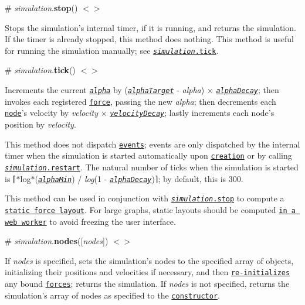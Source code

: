 \label{_simulation_stop}%
\# {\itshape simulation}.{\bfseries stop}() \href{https://github.com/d3/d3-force/blob/master/src/simulation.js#L84}{\tt $<$$>$}

Stops the simulation’s internal timer, if it is running, and returns the simulation. If the timer is already stopped, this method does nothing. This method is useful for running the simulation manually; see \href{#simulation_tick}{\tt {\itshape simulation}.tick}.

\label{_simulation_tick}%
\# {\itshape simulation}.{\bfseries tick}() \href{https://github.com/d3/d3-force/blob/master/src/simulation.js#L38}{\tt $<$$>$}

Increments the current \href{#simulation_alpha}{\tt {\itshape alpha}} by (\href{#simulation_alphaTarget}{\tt {\itshape alpha\+Target}} -\/ {\itshape alpha}) × \href{#simulation_alphaDecay}{\tt {\itshape alpha\+Decay}}; then invokes each registered \href{#simulation_force}{\tt force}, passing the new {\itshape alpha}; then decrements each \href{#simulation_nodes}{\tt node}’s velocity by {\itshape velocity} × \href{#simulation_velocityDecay}{\tt {\itshape velocity\+Decay}}; lastly increments each node’s position by {\itshape velocity}.

This method does not dispatch \href{#simulation_on}{\tt events}; events are only dispatched by the internal timer when the simulation is started automatically upon \href{#forceSimulation}{\tt creation} or by calling \href{#simulation_restart}{\tt {\itshape simulation}.restart}. The natural number of ticks when the simulation is started is ⌈$\ast$log$\ast$(\href{#simulation_alphaMin}{\tt {\itshape alpha\+Min}}) / {\itshape log}(1 -\/ \href{#simulation_alphaDecay}{\tt {\itshape alpha\+Decay}})⌉; by default, this is 300.

This method can be used in conjunction with \href{#simulation_stop}{\tt {\itshape simulation}.stop} to compute a \href{https://bl.ocks.org/mbostock/1667139}{\tt static force layout}. For large graphs, static layouts should be computed \href{https://bl.ocks.org/mbostock/01ab2e85e8727d6529d20391c0fd9a16}{\tt in a web worker} to avoid freezing the user interface.

\label{_simulation_nodes}%
\# {\itshape simulation}.{\bfseries nodes}(\mbox{[}{\itshape nodes}\mbox{]}) \href{https://github.com/d3/d3-force/blob/master/src/simulation.js#L88}{\tt $<$$>$}

If {\itshape nodes} is specified, sets the simulation’s nodes to the specified array of objects, initializing their positions and velocities if necessary, and then \href{#force_initialize}{\tt re-\/initializes} any bound \href{#simulation_force}{\tt forces}; returns the simulation. If {\itshape nodes} is not specified, returns the simulation’s array of nodes as specified to the \href{#forceSimulation}{\tt constructor}.

